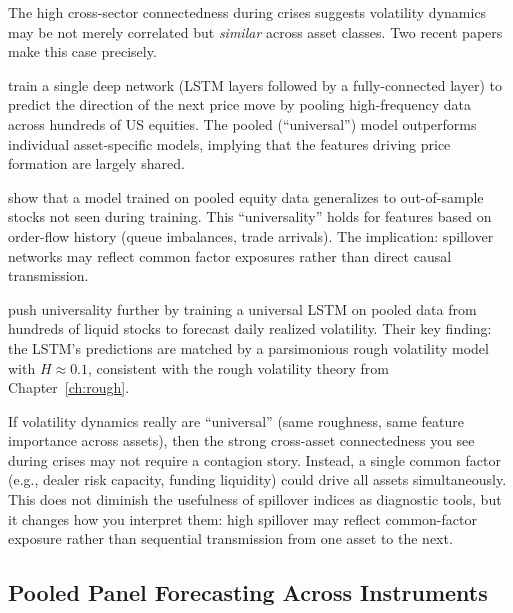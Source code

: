 The high cross-sector connectedness during crises suggests volatility dynamics may be
not merely correlated but \emph{similar} across asset classes.  Two recent papers make
this case precisely.

\citet{SirignanoCont2019} train a single deep network (LSTM layers followed by a
fully-connected layer) to predict the direction of the next price move by pooling
high-frequency data across hundreds of US equities.
The pooled (``universal'') model outperforms individual asset-specific
models, implying that the features driving price formation are largely shared.

\begin{keyresult}
\citet{SirignanoCont2019} show that a model trained on pooled equity data generalizes
to out-of-sample stocks not seen during training.  This ``universality'' holds for
features based on order-flow history (queue imbalances, trade arrivals).  The implication:
spillover networks may reflect common factor exposures rather than direct causal
transmission.
\end{keyresult}

\citet{RosenbaumZhang2022} push universality further by training a universal LSTM
on pooled data from hundreds of liquid stocks to forecast daily realized volatility.
Their key finding: the LSTM's predictions are matched by a parsimonious rough
volatility model with $H \approx 0.1$, consistent with the rough volatility theory
from Chapter~\ref{ch:rough}.

\begin{intuition}
If volatility dynamics really are ``universal'' (same roughness, same feature
importance across assets), then the strong cross-asset connectedness you see during
crises may not require a contagion story.  Instead, a single common factor (e.g.,
dealer risk capacity, funding liquidity) could drive all assets simultaneously.
This does not diminish the usefulness of spillover indices as diagnostic tools,
but it changes how you interpret them: high spillover may reflect common-factor
exposure rather than sequential transmission from one asset to the next.
\end{intuition}

\subsection{Pooled Panel Forecasting Across Instruments}\label{sec:universality-panel}

